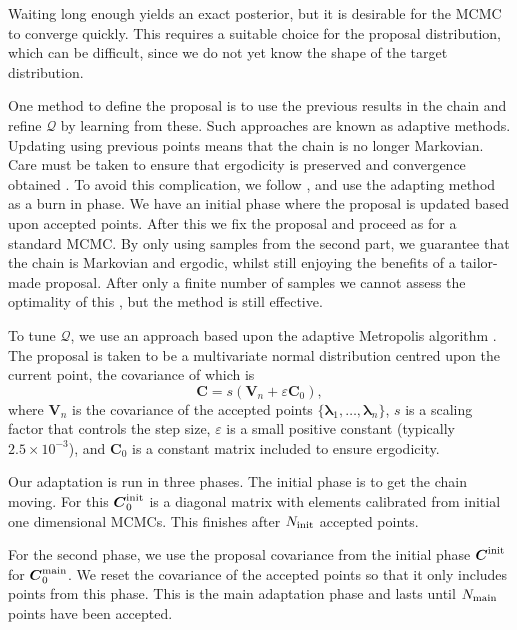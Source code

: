Waiting long enough yields an exact posterior, but it is desirable for the MCMC to converge quickly. This requires a suitable choice for the proposal distribution, which can be difficult, since we do not yet know the shape of the target distribution.

One method to define the proposal is to use the previous results in the chain and refine $\mathcal{Q}$ by learning from these. Such approaches are known as adaptive methods. Updating using previous points means that the chain is no longer Markovian. Care must be taken to ensure that ergodicity is preserved and convergence obtained \citep{Roberts2007,Andrieu2008}. To avoid this complication, we follow \citet{Haario1999}, and use the adapting method as a burn in phase. We have an initial phase where the proposal is updated based upon accepted points. After this we fix the proposal and proceed as for a standard MCMC. By only using samples from the second part, we guarantee that the chain is Markovian and ergodic, whilst still enjoying the benefits of a tailor-made proposal. After only a finite number of samples we cannot assess the optimality of this \citep{Andrieu2008}, but the method is still effective.

To tune $\mathcal{Q}$, we use an approach based upon the adaptive Metropolis algorithm \citep{Haario2001}. The proposal is taken to be a multivariate normal distribution centred upon the current point, the covariance of which is
\begin{equation}
\boldsymbol{C} = s \left(\boldsymbol{V}_n + \varepsilon\boldsymbol{C}_0\right),
\end{equation}
where $\boldsymbol{V}_n$ is the covariance of the accepted points $\{\boldsymbol{\lambda}_1,\ldots,\boldsymbol{\lambda}_n\}$, $s$ is a scaling factor that controls the step size, $\varepsilon$ is a small positive constant (typically $2.5 \times 10^{-3}$), and $\boldsymbol{C}_0$ is a constant matrix included to ensure ergodicity.

Our adaptation is run in three phases. The initial phase is to get the chain moving. For this $\boldsymbol{C}_0^\mathrm{init}$ is a diagonal matrix with elements calibrated from initial one dimensional MCMCs. This finishes after $N_\mathrm{init}$ accepted points.

For the second phase, we use the proposal covariance from the initial phase $\boldsymbol{C}^\mathrm{init}$ for $\boldsymbol{C}_0^\mathrm{main}$. We reset the covariance of the accepted points so that it only includes points from this phase. This is the main adaptation phase and lasts until $N_\mathrm{main}$ points have been accepted.


